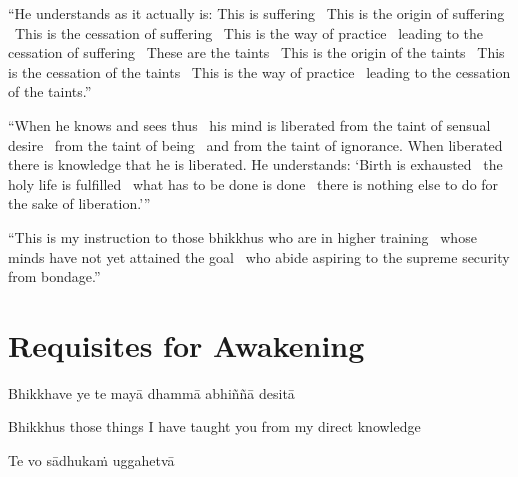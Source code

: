 \begin{justify}
  “He understands as it actually is: This is suffering \breathmark\ This is the origin of suffering \breathmark\ This is the cessation of suffering \breathmark\ This is the way of practice \breathmark\ leading to the cessation of suffering \breathmark\ These are the taints \breathmark\ This is the origin of the taints \breathmark\ This is the cessation of the taints \breathmark\ This is the way of practice \breathmark\ leading to the cessation of the taints.”
\end{justify}

\begin{justify}
  “When he knows and sees thus \breathmark\ his mind is liberated from the taint of sensual desire \breathmark\ from the taint of being \breathmark\ and from the taint of ignorance. When liberated there is knowledge that he is liberated. He understands: ‘Birth is exhausted \breathmark\ the holy life is fulfilled \breathmark\ what has to be done is done \breathmark\ there is nothing else to do for the sake of liberation.’”
\end{justify}

\suttaRef{[MN 39]}

\begin{justify}
  “This is my instruction to those bhikkhus who are in higher training \breathmark\ whose minds have not yet attained the goal \breathmark\ who abide aspiring to the supreme security from bondage.”
\end{justify}

\suttaRef{[MN 107]}


\section{Requisites for Awakening}
\label{requisites-for-awakening}

\begin{leader}
\end{leader}

Bhikkhave ye te mayā dhammā abhiññā desitā

\begin{english}
  Bhikkhus those things I have taught you from my direct knowledge
\end{english}

Te vo sādhukaṁ uggahetvā

